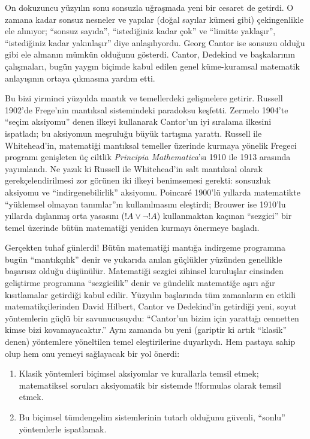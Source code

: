 On dokuzuncu yüzyılın sonu sonsuzla uğraşmada yeni bir cesaret de getirdi.
O zamana kadar sonsuz nesneler ve yapılar (doğal sayılar kümesi gibi)
çekingenlikle ele alınıyor; ``sonsuz sayıda'', ``istediğiniz kadar çok'' ve
``limitte yaklaşır'', ``istediğiniz kadar yakınlaşır'' diye anlaşılıyordu.
Georg Cantor ise sonsuzu olduğu gibi ele almanın mümkün olduğunu gösterdi.
Cantor, Dedekind ve başkalarının çalışmaları, bugün yaygın biçimde kabul
edilen genel küme-kuramsal matematik anlayışının ortaya çıkmasına yardım
etti.

Bu bizi yirminci yüzyılda mantık ve temellerdeki gelişmelere getirir.
Russell 1902'de Frege'nin mantıksal sistemindeki paradoksu keşfetti. Zermelo
1904'te ``seçim aksiyomu'' denen ilkeyi kullanarak Cantor'un iyi sıralama
ilkesini ispatladı; bu aksiyomun meşruluğu büyük tartışma yarattı. Russell
ile Whitehead'in, matematiği mantıksal temeller üzerinde kurmaya yönelik
Fregeci programı genişleten üç ciltlik \emph{Principia Mathematica}'sı
1910 ile 1913 arasında yayımlandı. Ne yazık ki Russell ile Whitehead'in salt
mantıksal olarak gerekçelendirilmesi zor görünen iki ilkeyi benimsemesi
gerekti: sonsuzluk aksiyomu ve ``indirgenebilirlik'' aksiyomu. Poincar\'e
1900'lü yıllarda matematikte ``yüklemsel olmayan tanımlar''ın kullanılmasını
eleştirdi; Brouwer ise 1910'lu yıllarda dışlanmış orta yasasını ($!A \lor
\lnot !A$) kullanmaktan kaçınan ``sezgici'' bir temel üzerinde bütün
matematiği yeniden kurmayı önermeye başladı.

Gerçekten tuhaf günlerdi!{} Bütün matematiği mantığa indirgeme programına
bugün ``mantıkçılık'' denir ve yukarıda anılan güçlükler yüzünden genellikle
başarısız olduğu düşünülür. Matematiği sezgici zihinsel kuruluşlar cinsinden
geliştirme programına ``sezgicilik'' denir ve gündelik matematiğe aşırı ağır
kısıtlamalar getirdiği kabul edilir. Yüzyılın başlarında tüm zamanların en
etkili matematikçilerinden David Hilbert, Cantor ve Dedekind'in getirdiği
yeni, soyut yöntemlerin güçlü bir savunucusuydu: ``Cantor'un bizim için
yarattığı cennetten kimse bizi kovamayacaktır.'' Aynı zamanda bu yeni
(gariptir ki artık ``klasik'' denen) yöntemlere yöneltilen temel eleştirilerine
duyarlıydı. Hem pastaya sahip olup hem onu yemeyi sağlayacak bir yol önerdi:
\begin{enumerate}
\item Klasik yöntemleri biçimsel aksiyomlar ve kurallarla temsil etmek;
  matematiksel soruları aksiyomatik bir sistemde !!{formula}s olarak
  temsil etmek.
\item Bu biçimsel tümdengelim sistemlerinin tutarlı olduğunu güvenli,
  ``sonlu'' yöntemlerle ispatlamak.
\end{enumerate}

